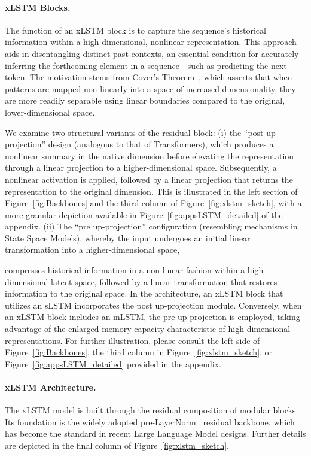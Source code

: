 \paragraph{xLSTM Blocks.}
\label{sec:xLSTMblock}
The function of an xLSTM block is to capture the sequence’s historical information within a high-dimensional, nonlinear representation. This approach aids in disentangling distinct past contexts, an essential condition for accurately inferring the forthcoming element in a sequence—such as predicting the next token. The motivation stems from Cover’s Theorem~\citep{Cover:65}, which asserts that when patterns are mapped non-linearly into a space of increased dimensionality, they are more readily separable using linear boundaries compared to the original, lower-dimensional space.

We examine two structural variants of the residual block: (i) the “post up-projection” design (analogous to that of Transformers), which produces a nonlinear summary in the native dimension before elevating the representation through a linear projection to a higher-dimensional space. Subsequently, a nonlinear activation is applied, followed by a linear projection that returns the representation to the original dimension. This is illustrated in the left section of Figure~\ref{fig:Backbones} and the third column of Figure~\ref{fig:xlstm_sketch}, with a more granular depiction available in Figure~\ref{fig:appsLSTM_detailed} of the appendix. (ii) The “pre up-projection” configuration (resembling mechanisms in State Space Models), whereby the input undergoes an initial linear transformation into a higher-dimensional space,

compresses historical information in a non-linear fashion within a high-dimensional latent space, followed by a linear transformation that restores information to the original space. In the architecture, an xLSTM block that utilizes an sLSTM incorporates the post up-projection module. Conversely, when an xLSTM block includes an mLSTM, the pre up-projection is employed, taking advantage of the enlarged memory capacity characteristic of high-dimensional representations. For further illustration, please consult the left side of Figure~\ref{fig:Backbones}, the third column in Figure~\ref{fig:xlstm_sketch}, or Figure~\ref{fig:appsLSTM_detailed} provided in the appendix.

\paragraph{xLSTM Architecture. }
\label{sec:xLSTMarchitecure}
The xLSTM model is built through the residual composition of modular blocks~\citep{Srivastava:15,He:16}. Its foundation is the widely adopted pre-LayerNorm~\citep{Ba:16b} residual backbone, which has become the standard in recent Large Language Model designs. Further details are depicted in the final column of Figure~\ref{fig:xlstm_sketch}.

